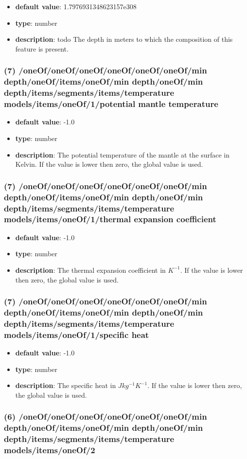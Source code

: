 \begin{itemize}[leftmargin=7em]\item {\bf default value}: 1.7976931348623157e308
\item {\bf type}: number
\item {\bf description}: todo The depth in meters to which the composition of this feature is present.
\end{itemize}\subsubsection{(7) /oneOf/oneOf/oneOf/oneOf/oneOf/oneOf/min depth/oneOf/items/oneOf/min depth/oneOf/min depth/items/segments/items/temperature models/items/oneOf/1/potential mantle temperature}
\begin{itemize}[leftmargin=7em]\item {\bf default value}: -1.0
\item {\bf type}: number
\item {\bf description}: The potential temperature of the mantle at the surface in Kelvin. If the value is lower then zero, the global value is used.
\end{itemize}\subsubsection{(7) /oneOf/oneOf/oneOf/oneOf/oneOf/oneOf/min depth/oneOf/items/oneOf/min depth/oneOf/min depth/items/segments/items/temperature models/items/oneOf/1/thermal expansion coefficient}
\begin{itemize}[leftmargin=7em]\item {\bf default value}: -1.0
\item {\bf type}: number
\item {\bf description}: The thermal expansion coefficient in $K^{-1}$. If the value is lower then zero, the global value is used.
\end{itemize}\subsubsection{(7) /oneOf/oneOf/oneOf/oneOf/oneOf/oneOf/min depth/oneOf/items/oneOf/min depth/oneOf/min depth/items/segments/items/temperature models/items/oneOf/1/specific heat}
\begin{itemize}[leftmargin=7em]\item {\bf default value}: -1.0
\item {\bf type}: number
\item {\bf description}: The specific heat in $J kg^{-1} K^{-1}$. If the value is lower then zero, the global value is used.
\end{itemize}\subsubsection{(6) /oneOf/oneOf/oneOf/oneOf/oneOf/oneOf/min depth/oneOf/items/oneOf/min depth/oneOf/min depth/items/segments/items/temperature models/items/oneOf/2}
